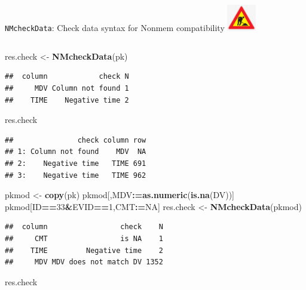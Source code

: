 \documentclass[
  8pt,
  ignorenonframetext,
  aspectratio=169]{beamer}
\newenvironment{Shaded}{\begin{snugshade}}{\end{snugshade}}
\newcommand{\DecValTok}[1]{\textcolor[rgb]{0.00,0.00,0.81}{#1}}
\newcommand{\ErrorTok}[1]{\textcolor[rgb]{0.64,0.00,0.00}{\textbf{#1}}}
\newcommand{\KeywordTok}[1]{\textcolor[rgb]{0.13,0.29,0.53}{\textbf{#1}}}
\newcommand{\NormalTok}[1]{#1}
\newcommand{\OperatorTok}[1]{\textcolor[rgb]{0.81,0.36,0.00}{\textbf{#1}}}
\newcommand{\OtherTok}[1]{\textcolor[rgb]{0.56,0.35,0.01}{#1}}
\newcommand{\StringTok}[1]{\textcolor[rgb]{0.31,0.60,0.02}{#1}}
\begin{document}
\begin{frame}[fragile]{\texttt{NMcheckData}: Check data syntax for
Nonmem compatibility
\includegraphics[width=0.5in]{figures/worksign.png}}
\begin{columns}[T]
\begin{column}{0.48\textwidth}
\scriptsize

\begin{Shaded}
\begin{Highlighting}[]
\NormalTok{res.check \textless{}{-}}\StringTok{ }\KeywordTok{NMcheckData}\NormalTok{(pk)}
\end{Highlighting}
\end{Shaded}

\begin{verbatim}
##  column            check N
##     MDV Column not found 1
##    TIME    Negative time 2
\end{verbatim}

\begin{Shaded}
\begin{Highlighting}[]
\NormalTok{res.check}
\end{Highlighting}
\end{Shaded}

\begin{verbatim}
##               check column row
## 1: Column not found    MDV  NA
## 2:    Negative time   TIME 691
## 3:    Negative time   TIME 962
\end{verbatim}

\begin{Shaded}
\begin{Highlighting}[]
\NormalTok{pkmod \textless{}{-}}\StringTok{ }\KeywordTok{copy}\NormalTok{(pk)}
\NormalTok{pkmod[,MDV}\OperatorTok{:}\ErrorTok{=}\KeywordTok{as.numeric}\NormalTok{(}\KeywordTok{is.na}\NormalTok{(DV))]}
\NormalTok{pkmod[ID}\OperatorTok{==}\DecValTok{33}\OperatorTok{\&}\NormalTok{EVID}\OperatorTok{==}\DecValTok{1}\NormalTok{,CMT}\OperatorTok{:}\ErrorTok{=}\OtherTok{NA}\NormalTok{]}
\NormalTok{res.check \textless{}{-}}\StringTok{ }\KeywordTok{NMcheckData}\NormalTok{(pkmod)}
\end{Highlighting}
\end{Shaded}

\begin{verbatim}
##  column                 check    N
##     CMT                 is NA    1
##    TIME         Negative time    2
##     MDV MDV does not match DV 1352
\end{verbatim}

\begin{Shaded}
\begin{Highlighting}[]
\NormalTok{res.check}
\end{Highlighting}
\end{Shaded}


\end{column}
\end{columns}
\end{frame}
\end{document}

